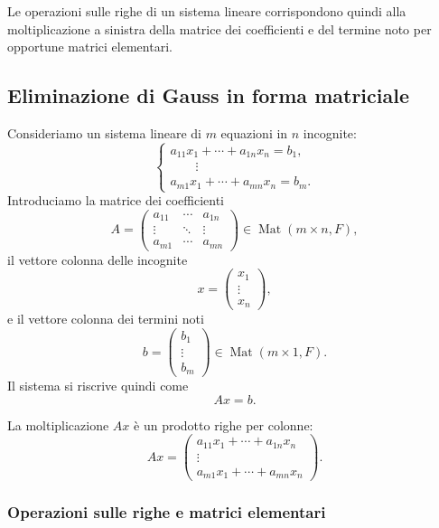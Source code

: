 \documentclass[a4paper]{article}
\begin{document}
\begin{snippetremark}{}
    Le operazioni sulle righe di un sistema lineare corrispondono quindi alla moltiplicazione a sinistra della matrice dei coefficienti e del termine noto per opportune matrici elementari.
\end{snippetremark}

\subsection{Eliminazione di Gauss in forma matriciale}

Consideriamo un sistema lineare di \(m\) equazioni in \(n\) incognite:
\[
    \begin{cases}
        a_{11}x_1+\cdots+a_{1n}x_n=b_1,\\
        \qquad\vdots\\
        a_{m1}x_1+\cdots+a_{mn}x_n=b_m.
    \end{cases}
\]
Introduciamo la matrice dei coefficienti
\[
    A=
    \begin{pmatrix}
        a_{11} & \cdots & a_{1n}\\
        \vdots & \ddots & \vdots\\
        a_{m1} & \cdots & a_{mn}
    \end{pmatrix}
    \in \operatorname{Mat}(m\times n,F),
\]
il vettore colonna delle incognite
\[
    x=
    \begin{pmatrix}
        x_1\\
        \vdots\\
        x_n
    \end{pmatrix},
\]
e il vettore colonna dei termini noti
\[
    b=
    \begin{pmatrix}
        b_1\\
        \vdots\\
        b_m
    \end{pmatrix}
    \in \operatorname{Mat}(m\times 1,F).
\]
Il sistema si riscrive quindi come
\[
    Ax=b.
\]

La moltiplicazione \(Ax\) è un prodotto righe per colonne:
\[
    Ax=
    \begin{pmatrix}
        a_{11}x_1+\cdots+a_{1n}x_n\\
        \vdots\\
        a_{m1}x_1+\cdots+a_{mn}x_n
    \end{pmatrix}.
\]

\subsubsection{Operazioni sulle righe e matrici elementari}
\end{document}
